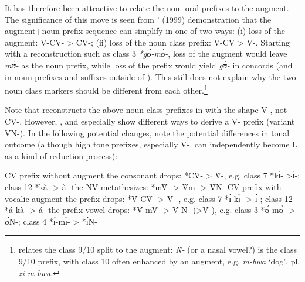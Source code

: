 \documentclass[output=paper]{langsci/langscibook}
\begin{document}
\begin{table}
\caption{The augment in PB and two daughter languages}
\label{tab:nasal:6}
\end{table}

It has therefore been attractive to relate the non- oral prefixes to the augment. The significance of this move is seen from \citeauthor{GrégoireJanssens1999}' (1999) demonstration that the augment+noun prefix sequence can simplify in one of two ways: (i) loss of the augment: V-CV- > CV-; (ii) loss of the noun class prefix: V-CV > V-. Starting with a  reconstruction such as class 3 \textit{*gʊ́-mʊ̀-}, loss of the augment would leave \textit{mʊ̀-} as the noun prefix, while loss of the prefix would yield \textit{gʊ́-} in concords (and in noun prefixes and suffixes outside of ). This still does not explain why the two noun class markers should be different from each other.\footnote{\citet{Williamson1993} relates the class 9/10 split to the augment: \textit{Ǹ-} (or a nasal vowel?) is the class 9/10 prefix, with class 10 often enhanced by an augment, e.g.  \textit{m-bwa} ‘dog’, pl. \textit{zi-m-bwa}.}

\newpage 
Note that \citet{deWolf1971} reconstructs the above noun class prefixes in  with the shape V-, not CV-. However, \citet{Hyman1980nasalclasses}, \citet{Miehe1991} and especially  \citet{GrégoireJanssens1999} show different ways to derive a V- prefix (variant VN-). In the following potential changes, note the potential differences in tonal outcome (although high tone prefixes, especially V-, can independently become L as a kind of reduction process):

\ea%
    \label{ex:nasal:1}
  \ea  CV prefix without augment
    \ea  the consonant drops:  *C\`{V}- > \`{V}-, e.g. class 7 *kɪ̀- >ɪ̀-; class 12 *kà- > à-
    \ex  the NV metathesizes:  *m\`{V}- > \`{V}m- > \`{V}N-
    \z
  \ex  CV prefix with vocalic augment
    \ea  the prefix drops:  *\'{V}-C\`{V}- > \'{V} -, e.g. class 7 *ɪ́-kɪ̀- > ɪ́-; class 12 *á-kà- > á-
    \ex  the prefix vowel drops:  *\'{V}-m\`{V}- > \'{V}-N- (>\'{V}-), e.g. class 3 *ʊ́-mʊ̀- > ʊ́N-;          class 4 *ɪ́-mɪ̀- > *ɪ́N-
    \z
  \z
\z
\end{document}

